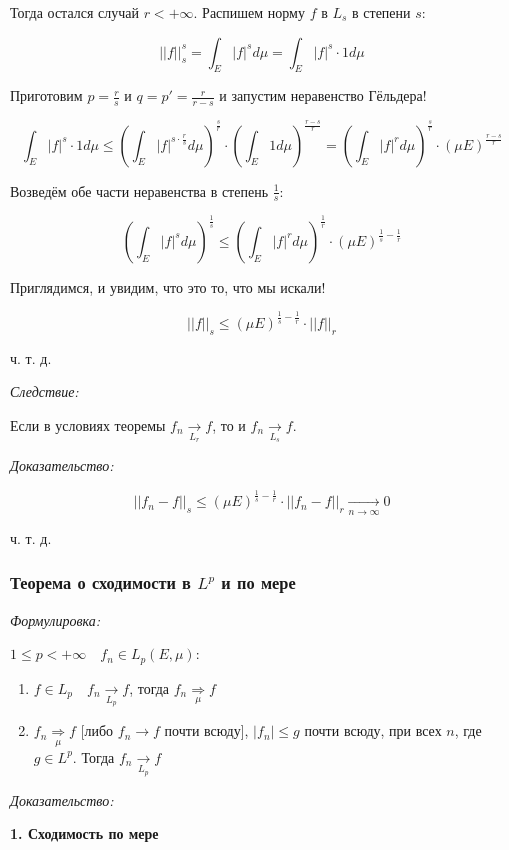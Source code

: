 \documentclass{article}
\def\goesto#1{\underset{#1}{\longrightarrow}}
\def\toinf#1{\goesto{#1 \rightarrow \infty}}
\def\ntoinf{\toinf{n}}
\begin{document}
Тогда остался случай $r < + \infty$. Распишем норму $f$ в $L_s$ в степени $s$:

\[||f||_s^s = \int_{E} |f|^s d\mu = \int_{E} |f|^s \cdot 1 d\mu\]

Приготовим $p = \frac{r}{s}$ и $q = p' = \frac{r}{r - s}$ и запустим неравенство Гёльдера! 

\[ \int_{E} |f|^s \cdot 1 d\mu \le \left(\int_{E} |f|^{s \cdot \frac{r}{s}} d\mu\right)^{\frac{s}{r}} \cdot \left(\int_{E} 1 d\mu\right)^{\frac{r - s}{r}} = \left(\int_{E} |f|^{r} d\mu\right)^{\frac{s}{r}} \cdot \left(\mu E\right)^{\frac{r - s}{r}}\]

Возведём обе части неравенства в степень $\frac{1}{s}$:

\[\left( \int_{E} |f|^s d\mu\right)^{\frac{1}{s}} \le  \left(\int_{E} |f|^{r} d\mu\right)^{\frac{1}{r}} \cdot \left(\mu E\right)^{\frac{1}{s} - \frac{1}{r}}\]

Приглядимся, и увидим, что это то, что мы искали!

\[||f||_s \le \left(\mu E\right)^{\frac{1}{s} - \frac{1}{r}} \cdot ||f||_r\]

ч. т. д. 

\textit{Следствие:}

Если в условиях теоремы $f_n \goesto{L_r} f$, то и $f_n \goesto{L_s} f$.

\textit{Доказательство:}

\[||f_n - f||_s \le \left(\mu E\right)^{\frac{1}{s} - \frac{1}{r}} \cdot ||f_n - f||_r \ntoinf 0\]

ч. т. д. 

\subsubsection{Теорема о сходимости в $L^p$ и по мере}
\textit{Формулировка:}

$1 \le p < +\infty \quad f_n \in L_p(E, \mu)$: 

\begin{enumerate}
    \item $f \in L_p \quad f_n \goesto{L_p} f$, тогда $f_n \underset{\mu}{\Longrightarrow} f$
    \item $f_n \underset{\mu}{\Longrightarrow} f$ [либо $f_n \rightarrow f$ почти всюду], $|f_n| \le g$ почти всюду, при всех $n$, где $g \in L^p$. Тогда $f_n \goesto{L_p} f$
\end{enumerate}

\textit{Доказательство:}

\textbf{1. Сходимость по мере}
\end{document}
